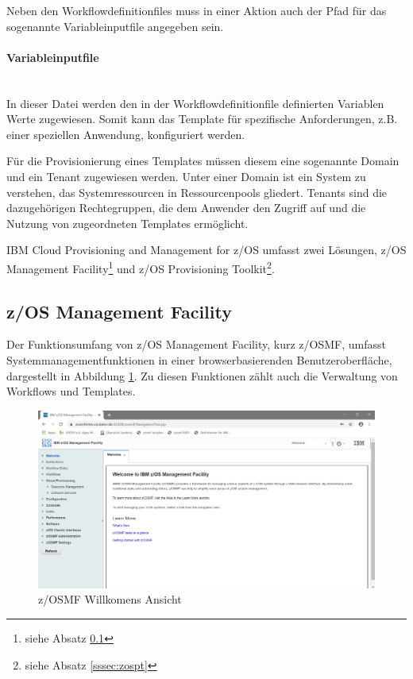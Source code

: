 Neben den Workflowdefinitionfiles muss in einer Aktion auch der Pfad für das sogenannte \glqq Variableinputfile\grqq{} angegeben sein.
\cite{.26.2.2020}

\paragraph{\glqq Variableinputfile\grqq}\label{par:variable} ~\\
In dieser Datei werden den in der Workflowdefinitionfile definierten Variablen Werte zugewiesen.
Somit kann das Template für spezifische Anforderungen, z.B. einer speziellen Anwendung,  konfiguriert werden.

Für die Provisionierung eines Templates müssen diesem eine sogenannte \glqq Domain\grqq{} und ein \glqq Tenant\grqq{} zugewiesen werden.
Unter einer \glqq Domain\grqq{} ist ein System zu verstehen, das Systemressourcen in Ressourcenpools gliedert.
\glqq Tenants\grqq{} sind die dazugehörigen Rechtegruppen, die dem Anwender den Zugriff auf und die Nutzung von zugeordneten Templates ermöglicht.
\cite{Rotthove.2018}

\glqq IBM Cloud Provisioning and Management for z/OS\grqq{} umfasst zwei Lösungen, \glqq z/OS Management Facility\grqq\footnote{siehe Absatz \ref{sssec:zosmf}} und \glqq z/OS Provisioning Toolkit\grqq\footnote{siehe Absatz \ref{sssec:zospt}}.

\subsection{z/OS Management Facility}\label{sssec:zosmf}
Der Funktionsumfang von z/OS Management Facility, kurz z/OSMF, umfasst Systemmanagementfunktionen
in einer browserbasierenden Benutzeroberfläche, dargestellt in Abbildung \ref{fig:zosmf_welcome}.
Zu diesen Funktionen zählt auch die Verwaltung von Workflows und Templates.

\begin{figure}[h]
\centering
\includegraphics[width=\textwidth]{figures/zosmf.png}
\caption{z/OSMF Willkomens Ansicht}
\label{fig:zosmf_welcome}
\end{figure}

